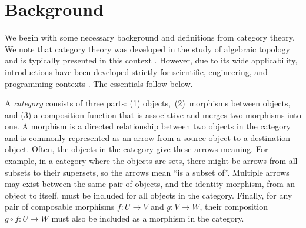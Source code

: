 \documentclass{article}
\begin{document}

\section{Background}


We begin with some necessary background and definitions from category theory.
We note that category theory was developed in the study of algebraic topology
and is typically presented in this context \cite{hatcher2002algebraic,
mac2013categories}. However, due to its wide applicability, introductions have
been developed strictly for scientific, engineering, and programming contexts
\cite{spivak2014category, fong2018seven, pierce1991basic}.  The essentials
follow below.

\label{categoryDef} 
A \emph{category} consists of three parts: (1)
objects,~(2)~morphisms between objects, and (3) a composition function that is
associative and merges two morphisms into one. A morphism is a directed
relationship between two objects in the category and is commonly represented as
an arrow from a source object to a destination object. Often, the objects in
the category give these arrows meaning. For example, in a category where the
objects are sets, there might be arrows from all subsets to their supersets, so
the arrows mean ``is a subset of''. Multiple arrows may exist between the same
pair of objects, and the identity morphism, from an object to itself, must be
included for all objects in the category. Finally, for any pair of composable
morphisms $f: U \rightarrow V$ and $g : V \rightarrow W$, their composition $ g
\circ f : U \rightarrow W $ must also be included as a morphism in the
category.
\end{document}
